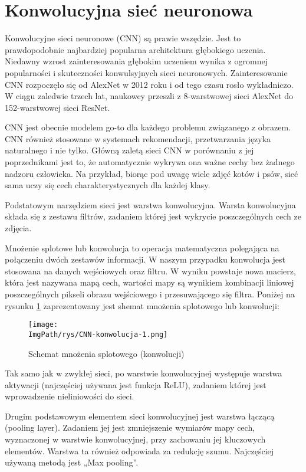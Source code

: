 \documentclass[a4paper,12pt,twoside,openany]{report}
\newcommand{\ImgPath}{.}
\begin{document}
\section{Konwolucyjna sieć neuronowa}
Konwolucyjne sieci neuronowe (CNN) są prawie wszędzie. Jest to prawdopodobnie najbardziej popularna architektura głębokiego uczenia. Niedawny wzrost zainteresowania  głębokim uczeniem wynika z ogromnej popularności i skuteczności konwulsyjnych sieci neuronowych. Zainteresowanie CNN rozpoczęło się od AlexNet w 2012 roku i od tego czasu rosło wykładniczo. W ciągu zaledwie trzech lat, naukowcy przeszli z 8-warstwowej sieci AlexNet do 152-warstwowej sieci ResNet.

CNN jest obecnie modelem go-to dla każdego problemu związanego z obrazem. CNN również stosowane w systemach rekomendacji, przetwarzania języka naturalnego i nie tylko. Główną zaletą sieci CNN w porównaniu z jej poprzednikami jest to, że automatycznie wykrywa ona ważne cechy bez żadnego nadzoru człowieka. Na przykład, biorąc pod uwagę wiele zdjęć kotów i psów, sieć sama uczy się cech charakterystycznych dla każdej klasy.

Podstatowym narzędziem  sieci  jest warstwa konwolucyjna. Warsta konwolucyjna składa się z zestawu filtrów, zadaniem której jest wykrycie poszczególnych cech ze zdjęcia. 

Mnożenie splotowe lub konwolucja to operacja matematyczna polegająca na połączeniu dwóch zestawów informacji. W naszym przypadku konwolucja jest stosowana na danych wejściowych oraz filtru. W wyniku powstaje nowa macierz, która jest nazywana mapą cech, wartości mapy są wynikiem kombinacji liniowej poszczególnych pikseli obrazu wejściowego i przesuwającego się filtra. Poniżej na rysunku \ref{schematKonwolucji}  zaprezentowany jest shemat mnożenia splotowego lub konwolucji:
\begin{figure}[!htbp]
	\begin{center}
		\centering
		\texttt{[image: \\ImgPath/rys/CNN-konwolucja-1.png]}
	\end{center}
	\caption{Schemat mnożenia splotowego (konwolucji)}
	\label{schematKonwolucji}
\end{figure}

Tak samo jak w zwykłej sieci, po warstwie konwolucyjnej występuje warstwa aktywacji (najczęściej używana jest funkcja ReLU),  zadaniem której jest wprowadzenie nieliniowości do sieci.
 
Drugim podstawowym elementem sieci konwolucyjnej jest warstwa łączącą (pooling layer). Zadaniem jej jest zmniejszenie wymiarów  mapy cech, wyznaczonej w warstwie konwolucyjnej, przy zachowaniu jej kluczowych elementów. Warstwa  ta również odpowiada za redukcję szumu. Najczęściej używaną metodą jest „Max pooling”. 
\end{document}

